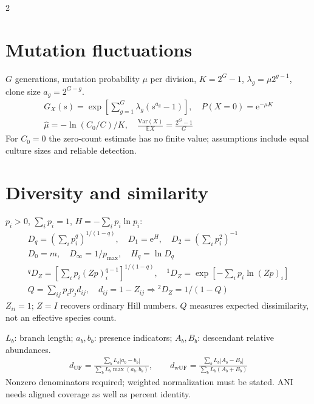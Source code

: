 \documentclass[10pt,a4paper]{scrartcl}
\newcommand{\ee}{\mathrm{e}}
\begin{document}
\begin{multicols}{2}
\section*{Mutation fluctuations}
$G$ generations, mutation probability $\mu$ per division, $K=2^G-1$, $\lambda_g=\mu2^{g-1}$, clone size $a_g=2^{G-g}$.
\begin{gather*}
G_X(s)=\exp\!\left[\sum_{g=1}^G\lambda_g(s^{a_g}-1)\right],\quad P(X=0)=\ee^{-\mu K}\\
\widehat\mu=-\ln(C_0/C)/K,\quad
\frac{\mathrm{Var}(X)}{\mathbb E X}=\frac{2^G-1}{G}
\end{gather*}
For $C_0=0$ the zero-count estimate has no finite value; assumptions include equal culture sizes and reliable detection.

\section*{Diversity and similarity}
$p_i>0$, $\sum_i p_i=1$, $H=-\sum_i p_i\ln p_i$:
\begin{gather*}
D_q=\left(\sum_i p_i^q\right)^{1/(1-q)},\quad D_1=\ee^H,\quad D_2=(\sum_i p_i^2)^{-1}\\
D_0=m,\quad D_\infty=1/p_{\max},\quad H_q=\ln D_q\\
{}^qD_Z=\left[\sum_i p_i(Zp)_i^{q-1}\right]^{1/(1-q)},\quad
{}^1D_Z=\exp[-\sum_i p_i\ln(Zp)_i]\\
Q=\sum_{ij}p_ip_jd_{ij},\quad d_{ij}=1-Z_{ij}\Rightarrow{}^2D_Z=1/(1-Q)
\end{gather*}
$Z_{ii}=1$; $Z=I$ recovers ordinary Hill numbers. $Q$ measures expected dissimilarity, not an effective species count.

$L_b$: branch length; $a_b,b_b$: presence indicators; $A_b,B_b$: descendant relative abundances.
\begin{gather*}
d_{\mathrm{UF}}=\frac{\sum_bL_b|a_b-b_b|}{\sum_bL_b\max(a_b,b_b)},\qquad
d_{\mathrm{wUF}}=\frac{\sum_bL_b|A_b-B_b|}{\sum_bL_b(A_b+B_b)}
\end{gather*}
Nonzero denominators required; weighted normalization must be stated. ANI needs aligned coverage as well as percent identity.


\end{multicols}
\end{document}
